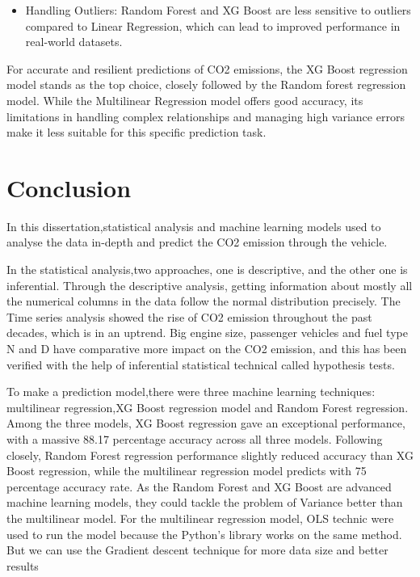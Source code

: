\documentclass[12pt, a4paper,oneside]{book}
\numberwithin{equation}{section}
\begin{document}
\begin{itemize}
    \item Handling Outliers: Random Forest and XG Boost are less sensitive to outliers compared to Linear Regression, which can lead to improved performance in real-world datasets.

\end{itemize}


For accurate and resilient predictions of CO2 emissions, the XG Boost regression model stands as the top choice, closely followed by the Random forest regression model. While the Multilinear Regression model offers good accuracy, its limitations in handling complex relationships and managing high variance errors make it less suitable for this specific prediction task.




\chapter{Conclusion}



In this dissertation,statistical analysis and machine learning models used to analyse the data in-depth and predict the CO2 emission through the vehicle. 

In the statistical analysis,two approaches, one is descriptive, and the other one is inferential. Through the descriptive analysis, getting information about mostly all the numerical columns in the data follow the normal distribution precisely. The Time series analysis showed the rise of CO2 emission throughout the past decades, which is in an uptrend. Big engine size, passenger vehicles and fuel type N and D  have comparative more impact on the CO2 emission, and this has been verified  with the help of inferential statistical technical called hypothesis tests.

To make a prediction model,there were three machine learning techniques: multilinear regression,XG Boost regression model and Random Forest regression. Among the three models, XG Boost regression gave an exceptional performance, with a massive 88.17 percentage accuracy across all three models. Following closely, Random Forest regression performance slightly reduced accuracy than XG Boost regression, while the multilinear regression model predicts with 75 percentage accuracy rate. As the Random Forest and XG Boost are advanced machine learning models, they could tackle the problem of Variance better than the multilinear model. For the multilinear regression model, OLS technic were used to run the model because the Python’s library works on the same method. But we can use the Gradient descent technique for more data size and better results
\end{document}
